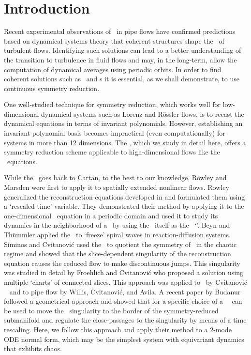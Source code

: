\section{Introduction}
\label{s:intro}

Recent experimental observations of \reqva\ in pipe flows have confirmed
predictions based on dynamical systems theory that coherent structures shape 
the \statesp\ of turbulent flows. Identifying such solutions can lead to a better
understanding of the transition to turbulence in fluid flows and may, in the long-term,
allow the computation of dynamical averages using periodic orbits. In order to
find coherent solutions such as \reqva\ and \rpo s it is essential, as we shall demonstrate, 
to use continuous symmetry reduction.

One well-studied technique for symmetry reduction, which works well for low-dimensional dynamical systems such 
as Lorenz and R\"{o}ssler flows, is to recast the dynamical equations in terms of invariant polynomials. However, establishing an invariant polynomial basis becomes impractical (even computationally) for systems in more than 12 dimensions.
The \mslices%
,
which we study in detail here, offers a symmetry reduction
scheme applicable to high-dimensional flows like the \NS\ equations.

While the \mslices\ goes back to Cartan, to the
best to our knowledge, Rowley and Marsden
were first to apply it to spatially extended nonlinear flows. Rowley
\etal~ generalized the reconstruction equations
developed in  and formulated them using a `rescaled
time' variable. They demonstrated their method by applying it to the one-dimensional \KS\ equation
in a periodic domain and used it to study its dynamics in the neighborhood of a \reqv\ by using the \reqv\ itself as the \slice\ `\template'.  Beyn and
Th\"{u}mmler applied the \mslices\ to `freeze' spiral
waves in reaction-diffusion systems.
Siminos and Cvitanovi\'{c} used the \mslices\ to quotient the  symmetry of
\cLf\ in the chaotic regime and showed that the slice-dependent
singularity of the reconstruction equation causes the reduced flow to make
discontinuous jumps. This singularity was studied in detail by 
Froehlich and Cvitanovi\'{c} who proposed a solution using multiple `charts' of connected
slices. This approach was applied to \cLf\
by Cvitanovi\'{c} \etal~ and to pipe flow by Willis, Cvitanovi\'{c}, and Avila. A
recent paper by Budanur \etal\rf{BudCvi14} followed a geometrical approach
and showed that for \SOn{2} a specific choice of a \slice\
\template\ can be used to move the \slice\ singularity to the border of the
symmetry-reduced submanifold and regulate the close-passages to the
singularity by means of a time rescaling. Here, we follow this approach
and apply their method to a 2-mode ODE normal form, which may be
the simplest system with \SOn{2} equivariant dynamics
that exhibits chaos.

